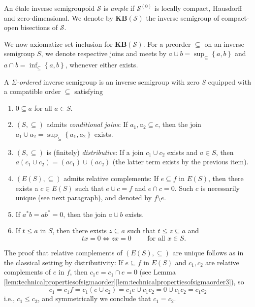 \begin{definition}
    An étale inverse semigroupoid $\mathcal{S}$ is \emph{ample} if $\mathcal{S}^{(0)}$ is locally compact, Hausdorff and zero-dimensional. We denote by $\mathbf{KB}(\mathcal{S})$ the inverse semigroup of compact-open bisections of $\mathcal{S}$.
\end{definition}

We now axiomatize set inclusion for $\mathbf{KB}(\mathcal{S})$. For a preorder $\subseteq$ on an inverse semigroup $S$, we denote respective joins and meets by $a\cup b=\sup_{\subseteq}\left\{a,b\right\}$ and $a\cap b=\inf_{\subseteq}\left\{a,b\right\}$, whenever either exists.

\begin{definition}\label{def:sigmaorder}
A \emph{$\Sigma$-ordered} inverse semigroup is an inverse semigroup with zero $S$ equipped with a compatible order $\subseteq$ satisfying
\begin{enumerate}[label=($\Sigma$-\roman*)]
    \item\label{def:sigmaorder.0minimum} $0\subseteq a$ for all $a\in S$.
    \item\label{def:sigmaorder.conditionaljoins} $(S,\subseteq)$ admits \emph{conditional joins}: If $a_1,a_2\subseteq c$, then the join $a_1\cup a_2=\sup_{\subseteq}\left\{a_1,a_2\right\}$ exists.
    \item\label{def:sigmaorder.distributivity} $(S,\subseteq)$ is (finitely) \emph{distributive}: If a join $c_1\cup c_2$ exists and $a\in S$, then $a(c_1\cup c_2)=(ac_1)\cup (ac_2)$ (the latter term exists by the previous item).
    \item\label{def:sigmaorder.ESrelativecomplements} $(E(S),\subseteq)$ admits relative complements: If $e\subseteq f$ in $E(S)$, then there exists a $c\in E(S)$ such that $e\cup c=f$ and $e\cap c=0$. Such $c$ is necessarily unique (see next paragraph), and denoted by $f\setminus e$.
    \item\label{def:sigmaorder.zerojoins} If $a^*b=ab^*=0$, then the join $a\cup b$ exists.
    \item\label{def:sigmaorder.interpolation} If $t\leq a$ in $S$, then there exists $z\subseteq a$ such that $t\leq z\subseteq a$ and
    \[tx=0\iff zx=0\qquad\text{ for all }x\in S.\]
\end{enumerate}
\end{definition}

The proof that relative complements of $(E(S),\subseteq)$ are unique follows as in the classical setting by distributivity: If $e\subseteq f$ in $E(S)$ and $c_1,c_2$ are relative complements of $e$ in $f$, then $c_1e=c_1\cap e=0$ (see Lemma \ref{lem:technicalpropertiesofsigmaorder}\ref{lem:technicalpropertiesofsigmaorder3}), so
\[c_1=c_1f=c_1(e\cup c_2)=c_1e\cup c_1c_2=0\cup c_1c_2=c_1c_2\]
i.e., $c_1\leq c_2$, and symmetrically we conclude that $c_1=c_2$.

